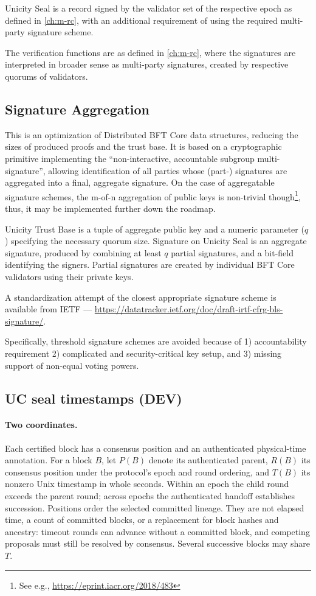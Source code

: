 Unicity Seal is a record signed by the validator set of the respective epoch as defined in \ref{ch:m-rc}, with an additional requirement of using the required multi-party signature scheme.

The verification functions are as defined in \ref{ch:m-rc}, where the signatures are interpreted in broader sense as multi-party signatures, created by respective quorums of validators.


\subsection{Signature Aggregation}\label{sec:signature-aggregation}

This is an optimization of Distributed BFT Core data structures, reducing the sizes of produced proofs and the trust base. It is based on a cryptographic primitive implementing the ``non-interactive, accountable subgroup multi-signature'', allowing identification of all parties whose (part-) signatures are aggregated into a final, aggregate signature. On the case of aggregatable signature schemes, the m-of-n aggregation of public keys is non-trivial though\footnote{See e.g., \url{https://eprint.iacr.org/2018/483}}, thus, it may be implemented further down the roadmap.

Unicity Trust Base is a tuple of aggregate public key and a numeric parameter ($q$) specifying the necessary quorum size. Signature on Unicity Seal is an aggregate signature, produced by combining at least $q$ partial signatures, and a bit-field identifying the signers. Partial signatures are created by individual BFT Core validators using their private keys.

A standardization attempt of the closest appropriate signature scheme is available from IETF --- \url{https://datatracker.ietf.org/doc/draft-irtf-cfrg-bls-signature/}.

Specifically, threshold signature schemes are avoided because of 1) accountability requirement 2) complicated and security-critical key setup, and 3) missing support of non-equal voting powers.

\subsection{UC seal timestamps (DEV)}
\label{sec:root-time-semantics}
\paragraph{Two coordinates.}
Each certified block has a consensus position and an authenticated physical-time
annotation. For a block $B$, let $P(B)$ denote its authenticated parent, $R(B)$
its consensus position under the protocol's epoch and round ordering, and $T(B)$
its nonzero Unix timestamp in whole seconds. Within an epoch the child round
exceeds the parent round; across epochs the authenticated handoff establishes
succession. Positions order the selected committed lineage. They are not elapsed
time, a count of committed blocks, or a replacement for block hashes and ancestry:
timeout rounds can advance without a committed block, and competing proposals
must still be resolved by consensus. Several successive blocks may share $T$.

